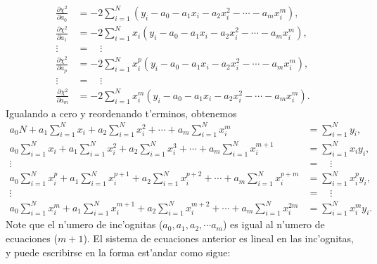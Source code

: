 \begin{align}
\frac{\partial\chi^2}{\partial a_0} &= -2\sum_{i=1}^N \left(y_i-a_0-a_1x_i-a_2x_i^2-\cdots -a_mx_i^m\right) ,\\
\frac{\partial\chi^2}{\partial a_1} &= -2\sum_{i=1}^N x_i\left(y_i-a_0-a_1x_i-a_2x_i^2-\cdots -a_mx_i^m\right) ,\\
\vdots \quad &= \quad \vdots  \\
\frac{\partial\chi^2}{\partial a_p} &= -2\sum_{i=1}^N x_i^p\left(y_i-a_0-a_1x_i-a_2x_i^2-\cdots -a_mx_i^m\right) ,\\
\vdots \quad &= \quad \vdots  \\
\frac{\partial\chi^2}{\partial a_m} &= -2\sum_{i=1}^N x_i^m\left(y_i-a_0-a_1x_i-a_2x_i^2-\cdots -a_mx_i^m\right).
\end{align}
Igualando a cero y reordenando t'erminos, obtenemos
\begin{align}
a_0 N + a_1\sum_{i=1}^N x_i +a_2 \sum_{i=1}^N x_i^2 + \cdots + a_m \sum_{i=1}^N x_i^m &= \sum_{i=1}^N y_i, \\
a_0 \sum_{i=1}^N x_i + a_1\sum_{i=1}^N x_i^2 +a_2 \sum_{i=1}^N x_i^3 + \cdots + a_m \sum_{i=1}^N x_i^{m+1} &= \sum_{i=1}^N x_iy_i, \\
\vdots\quad &= \quad \vdots \\
a_0 \sum_{i=1}^N x_i^p + a_1\sum_{i=1}^N x_i^{p+1} +a_2 \sum_{i=1}^N x_i^{p+2} + \cdots + a_m \sum_{i=1}^N x_i^{p+m} &= \sum_{i=1}^N x_i^py_i, \\
\vdots\quad &= \quad \vdots \\
a_0 \sum_{i=1}^N x_i^m + a_1\sum_{i=1}^N x_i^{m+1} +a_2 \sum_{i=1}^N x_i^{m+2} + \cdots + a_m \sum_{i=1}^N x_i^{2m} &= \sum_{i=1}^N x_i^my_i.
\end{align}
Note que el n'umero de inc'ognitas ($a_0, a_1, a_2,\cdots a_m$) es igual al n'umero de ecuaciones ($m+1$). El sistema de ecuaciones anterior es lineal en las inc'ognitas, y puede escribirse en la forma est'andar como sigue:
